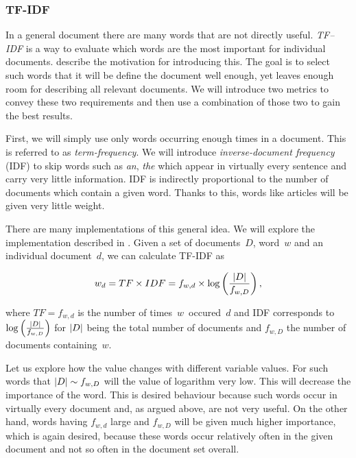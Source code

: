 \subsubsection{TF-IDF}

In a general document there are many words that are not directly useful.
{\it TF--IDF} is a way to evaluate which words are the most important for individual documents.  
\citet{SalBuc88} describe the motivation for introducing this.
The goal is to select such words that it will be define the document well enough, yet leaves enough room for describing all relevant documents.
We will introduce two metrics to convey these two requirements and then use a combination of those two to gain the best results.

First, we will simply use only words occurring enough times in a document. This is referred to as {\it term-frequency}.
We will introduce {\it inverse-document frequency} (IDF) to skip words such as {\it an}, {\it the} which appear in virtually every sentence and carry very little information.
IDF is indirectly proportional to the number of documents which contain a given word.
Thanks to this, words like articles will be given very little weight.

There are many implementations of this general idea. We will explore the implementation described in \citet{Ramos03}. Given a set of documents~$D$, word~$w$ and an individual document~$d$,
we can calculate TF-IDF as

\[
	w_d = TF \times IDF = f_{w, d} \times \log \left( {\left|{D}\right|\over f_{w,D}}  \right),
\]

where $TF = f_{w, d}$ is the number of times~$w$~occured~$d$ and IDF corresponds to $\log \left( {\left|{D}\right|\over f_{w,D}}  \right)$ for $\left|{D}\right|$ being the total number of documents and $f_{w, D}$ the number of documents containing~$w$.

Let us explore how the value changes with different variable values. For such words that $\left|{D}\right| \sim f_{w, D}$ will the value of logarithm very low. This will decrease the importance of the word. This is desired behaviour because such words occur in virtually every document and, as argued above, are not very useful. On the other hand, words having $f_{w,d}$ large and $f_{w,D}$ will be given much higher importance, which is again desired, because these words occur relatively often in the given document and not so often in the document set overall.


